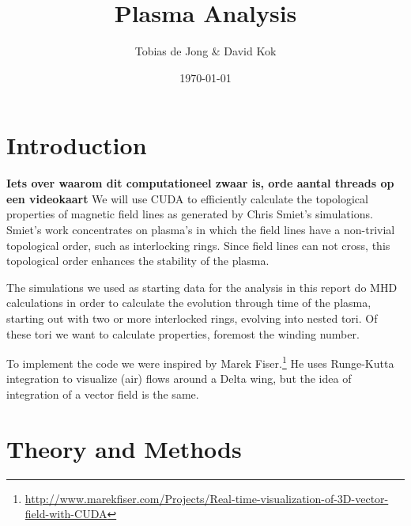 \documentclass{article}
\begin{document}
\title{Plasma Analysis}
\author{Tobias de Jong \& David Kok}
\date{\today}
\maketitle

\section{Introduction}
{\bf Iets over waarom dit computationeel zwaar is, orde aantal threads op een videokaart}
We will use CUDA to efficiently calculate the topological properties of magnetic field lines as generated by Chris Smiet's simulations.\cite{PhysRevLett.115.095001}\\
Smiet's work concentrates on plasma's in which the field lines have a non-trivial topological order, such as interlocking rings. Since field lines can not cross, this topological order enhances the stability of the plasma.

The simulations we used as starting data for the analysis in this report do MHD calculations in order to calculate the evolution through time of the plasma, starting out with two or more interlocked rings, evolving into nested tori.
Of these tori we want to calculate properties, foremost the winding number.

To implement the code we were inspired by Marek Fiser.\footnote{\url{http://www.marekfiser.com/Projects/Real-time-visualization-of-3D-vector-field-with-CUDA}} He uses Runge-Kutta integration to visualize (air) flows around a Delta wing, but the idea of integration of a vector field is the same.

\section{Theory and Methods}
\end{document}
